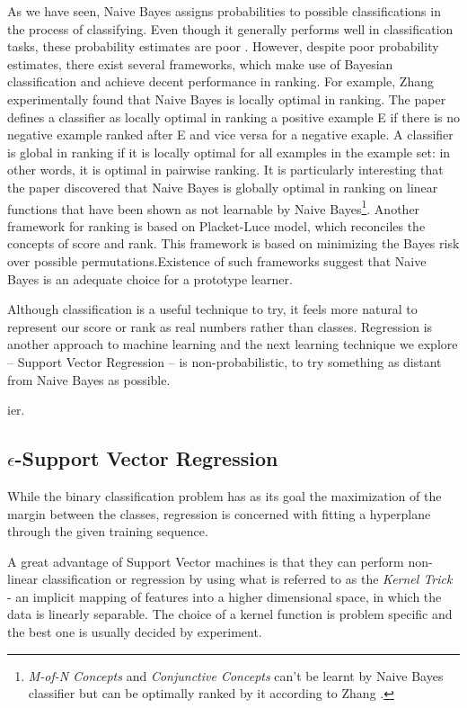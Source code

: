 \documentclass[12pt,notitlepage,twoside]{scrreprt}
\begin{document}
As we have seen, Naive Bayes assigns probabilities to possible classifications
in the process of classifying. Even though it generally performs well in
classification tasks, these probability estimates are poor \cite{domingos96}.
However, despite poor probability estimates, there exist several frameworks,
which make use of Bayesian classification and achieve decent performance in
ranking. For example, Zhang \cite{zhang04} experimentally found that Naive
Bayes is locally optimal in ranking. The paper defines a classifier as locally
optimal in ranking a positive example E if there is no negative example ranked
after E and vice versa for a negative exaple. A classifier is global in ranking
if it is locally optimal for all examples in the example set: in other words,
it is optimal in pairwise ranking.  It is particularly interesting that the
paper discovered that Naive Bayes is globally optimal in ranking on linear
functions that have been shown as not learnable by Naive
Bayes\footnote{\textit{M-of-N
  Concepts} and \textit{Conjunctive Concepts} can't be learnt by Naive Bayes classifier but
can be optimally ranked by it according to Zhang \cite{zhang04}.}.
Another framework for ranking \cite{bayesrank} is based on Placket-Luce model, which reconciles
the concepts of score and rank. This framework is based on minimizing the Bayes
risk over possible permutations.Existence of such frameworks suggest that Naive Bayes is an adequate choice
for a prototype learner.

Although classification is a useful technique to try, it feels more natural to
represent our score or rank as real numbers rather than classes. Regression is
another approach to machine learning and the next learning technique we explore
-- Support Vector Regression -- is non-probabilistic, to try something as distant
from Naive Bayes as possible.

ier. \subsection{$\epsilon$-Support Vector Regression}
\label{prep:svm}
While the binary classification problem has as its goal the maximization of the
margin between the classes, regression is concerned with fitting a hyperplane
through the given training sequence. 

A great advantage of Support Vector machines is that they can perform
non-linear classification or regression by using what is referred to as the
\textit{Kernel Trick} - an implicit mapping of features into a higher
dimensional space, in which the data is linearly separable. The choice of a
kernel function is problem specific and the best one is usually decided by
experiment.
\end{document}
